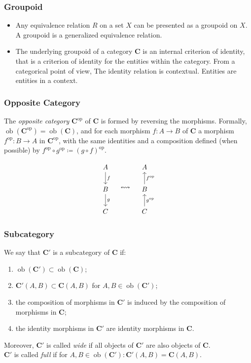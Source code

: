 \documentclass[UTF8,11pt,colorlinks,compress,openany]{beamer}%
\begin{document}
\begin{frame}\frametitle{Groupoid}
\begin{itemize}
	\item Any equivalence relation $R$ on a set $X$ can be presented as a groupoid on $X$. A groupoid is a generalized equivalence relation.
	\item The underlying groupoid of a category $\mathbf{C}$ is an internal criterion of identity, that is a criterion of identity for the entities within the category. From a categorical point of view, The identity relation is contextual. Entities are entities in a context.
\end{itemize}
\end{frame}

\begin{frame}\frametitle{Opposite Category}
\begin{definition}
The \emph{opposite category} $\mathbf{C}^\mathrm{op}$ of $\mathbf{C}$ is formed by reversing the morphisms. Formally, $\operatorname{ob}(\mathbf{C}^\mathrm{op})=
\operatorname{ob}(\mathbf{C})$, and for each morphism $f: A\to B$ of $\mathbf{C}$ a morphism $f^\mathrm{op}: B\to A$ in $\mathbf{C}^\mathrm{op}$, with the same identities and a composition defined (when possible) by $f^\mathrm{op}\circ g^\mathrm{op}\coloneqq (g\circ f)^\mathrm{op}$.
\end{definition}
\[
\begin{tikzcd}
A \arrow[d,"f"]\\
B \arrow[d,"g"]\\
C
\end{tikzcd}
\quad\leftrightsquigarrow\quad
\begin{tikzcd}
A\\
B \arrow[u,"f^\mathrm{op}" swap]\\
C \arrow[u,"g^\mathrm{op}" swap]
\end{tikzcd}
\]
\end{frame}

\begin{frame}\frametitle{Subcategory}
\begin{definition}[Subcategory]
	We say that $\mathbf{C}'$ is a subcategory of $\mathbf{C}$ if:
	\begin{enumerate}
		\item $\operatorname{ob}(\mathbf{C}')\subset\operatorname{ob}(\mathbf{C})$;
		\item $\mathbf{C}'(A,B)\subset\mathbf{C}(A,B)$ for $A,B\in\operatorname{ob}(\mathbf{C}')$;
		\item the composition of morphisms in $\mathbf{C}'$ is induced by the composition of morphisms in $\mathbf{C}$;
		\item the identity morphisms in $\mathbf{C}'$ are identity morphisms in $\mathbf{C}$.
	\end{enumerate}
\end{definition}
Moreover, $\mathbf{C}'$ is called \emph{wide} if all objects of $\mathbf{C}'$ are also objects of $\mathbf{C}$.\\
$\mathbf{C}'$ is called \emph{full} if for $A,B\in\operatorname{ob}(\mathbf{C}'):\mathbf{C}'(A,B)=\mathbf{C}(A,B)$.
\end{frame}
\end{document}
